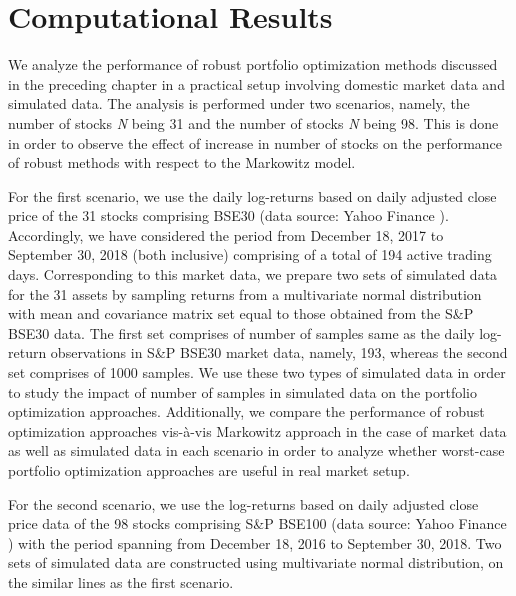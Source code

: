 \chapter{Computational Results}

We analyze the performance of robust portfolio optimization methods discussed in the preceding chapter in a practical setup involving domestic market data and simulated data. The analysis is performed under two scenarios, namely, the number of stocks \textit{N} being 31 and the number of stocks \textit{N} being 98. This is done in order to observe the effect of increase in number of stocks on the performance of robust methods with respect to the Markowitz model. 

For the first scenario, we use the daily log-returns based on daily adjusted close price of the 31 stocks comprising BSE30 (data source: Yahoo Finance \cite{yf}). Accordingly, we have considered the period from December 18, 2017 to September 30, 2018 (both inclusive) comprising of a total of 194 active trading days. Corresponding to this market data, we prepare two sets of simulated data for the 31 assets by sampling returns from a multivariate normal distribution with mean and covariance matrix set equal to those obtained from the S\&P BSE30 data. The first set comprises of number of samples same as the daily log-return observations in S\&P BSE30 market data, namely, 193, whereas the second set comprises of 1000 samples. We use these two types of simulated data in order to study the impact of number of samples in simulated data on the portfolio optimization approaches. Additionally, we compare the performance of robust optimization approaches vis-\`a-vis Markowitz approach in the case of market data as well as simulated data in each scenario in order to analyze whether worst-case portfolio optimization approaches are useful in real market setup.

For the second scenario, we use the log-returns based on daily adjusted close price data of the 98 stocks comprising S\&P BSE100 (data source: Yahoo Finance \cite{yf}) with the period spanning from December 18, 2016 to September 30, 2018. Two sets of simulated data are constructed using multivariate normal distribution, on the similar lines as the first scenario.

